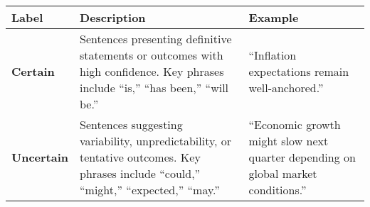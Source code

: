 \begin{table*}
    \caption{}
    \vspace{1em}
    \begin{tabular}{p{}p{}p{}}
    \toprule
    \textbf{Label} & \textbf{Description} & \textbf{Example} \\
    \midrule
    \textbf{Certain} & Sentences presenting definitive statements or outcomes with high confidence. Key phrases include ``is,'' ``has been,'' ``will be.'' & ``Inflation expectations remain well-anchored.'' \\
    \textbf{Uncertain} & Sentences suggesting variability, unpredictability, or tentative outcomes. Key phrases include ``could,'' ``might,'' ``expected,'' ``may.'' & ``Economic growth might slow next quarter depending on global market conditions.'' \\
    \midrule
    \bottomrule
    \end{tabular}
    \label{tb:boc_certainty_guide}
\end{table*}